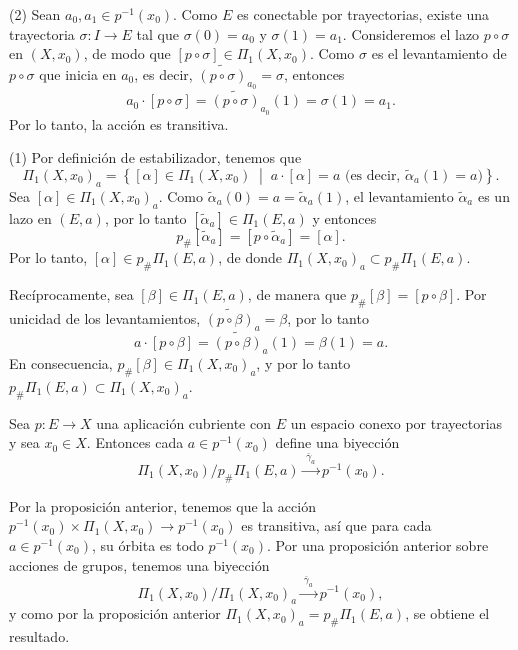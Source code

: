 \begin{dem}
(2) Sean $a_0, a_1 \in p^{-1}(x_0)$. Como $E$ es conectable por trayectorias, existe una trayectoria $\sigma \colon I \to E$ tal que $\sigma(0) = a_0$ y $\sigma(1) = a_1$. Consideremos el lazo $p \circ \sigma$ en $(X, x_0)$, de modo que $[p \circ \sigma] \in \Pi_1(X, x_0)$. Como $\sigma$ es el levantamiento de $p \circ \sigma$ que inicia en $a_0$, es decir, $\widetilde{(p \circ \sigma)}_{a_0} = \sigma$, entonces
    \[
    a_0 \cdot [p \circ \sigma] = \widetilde{(p \circ \sigma)}_{a_0}(1) = \sigma(1) = a_1.
    \]
    Por lo tanto, la acción es transitiva.


(1) Por definición de estabilizador, tenemos que
    \[
    \Pi_1(X, x_0)_a = \left\{ [\alpha] \in \Pi_1(X, x_0) \;\middle|\; a \cdot [\alpha] = a \text{ (es decir, } \widetilde{\alpha}_a(1) = a\text{)} \right\}.
    \]
    Sea $[\alpha] \in \Pi_1(X, x_0)_a$. Como $\widetilde{\alpha}_a(0) = a = \widetilde{\alpha}_a(1)$, el levantamiento $\widetilde{\alpha}_a$ es un lazo en $(E, a)$, por lo tanto $[\widetilde{\alpha}_a] \in \Pi_1(E, a)$ y entonces
    \[
    p_{\#}[\widetilde{\alpha}_a] = [p \circ \widetilde{\alpha}_a] = [\alpha].
    \]
    Por lo tanto, $[\alpha] \in p_{\#}\Pi_1(E, a)$, de donde $\Pi_1(X, x_0)_a \subset p_{\#}\Pi_1(E, a)$.

    Recíprocamente, sea $[\beta] \in \Pi_1(E, a)$, de manera que $p_{\#}[\beta] = [p \circ \beta]$. Por unicidad de los levantamientos, $\widetilde{(p \circ \beta)}_a = \beta$, por lo tanto
    \[
    a \cdot [p \circ \beta] = \widetilde{(p \circ \beta)}_a(1) = \beta(1) = a.
    \]
    En consecuencia, $p_{\#}[\beta] \in \Pi_1(X, x_0)_a$, y por lo tanto $p_{\#}\Pi_1(E, a) \subset \Pi_1(X, x_0)_a$.
\end{dem}

\begin{coro}
\label{coro:biyeccion_fibra_cosets}
Sea $p \colon E \to X$ una aplicación cubriente con $E$ un espacio conexo por trayectorias y sea $x_0 \in X$. Entonces cada $a \in p^{-1}(x_0)$ define una biyección
\[
\Pi_1(X, x_0) / p_{\#}\Pi_1(E, a) \xrightarrow{\;\bar{\gamma}_a\;} p^{-1}(x_0).
\]
\end{coro}

\begin{dem}
Por la proposición anterior, tenemos que la acción $p^{-1}(x_0) \times \Pi_1(X, x_0) \to p^{-1}(x_0)$ es transitiva, así que para cada $a \in p^{-1}(x_0)$, su órbita es todo $p^{-1}(x_0)$. Por una proposición anterior sobre acciones de grupos, tenemos una biyección
\[
\Pi_1(X, x_0) / \Pi_1(X, x_0)_a \xrightarrow{\;\bar{\gamma}_a\;} p^{-1}(x_0),
\]
y como por la proposición anterior $\Pi_1(X, x_0)_a = p_{\#}\Pi_1(E, a)$, se obtiene el resultado.
\end{dem}

